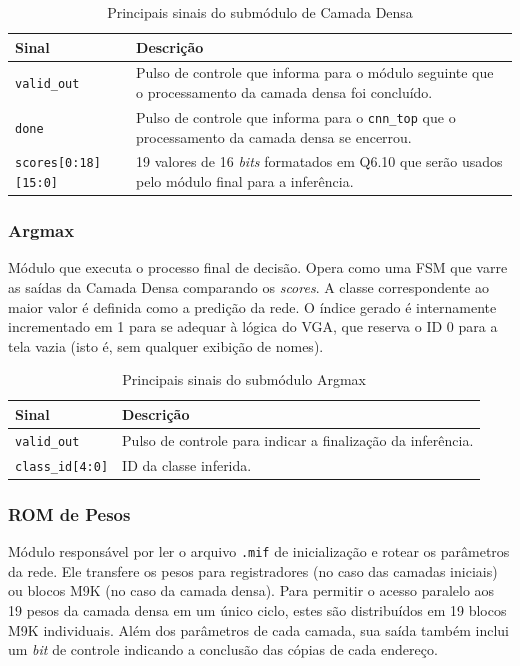 \begin{table}[H]
\centering
\caption{Principais sinais do submódulo de Camada Densa}
\label{tab:sinais_camada_densa}
\small
\begin{tabularx}{\textwidth}{l X}
\toprule
\textbf{Sinal} & \textbf{Descrição} \\
\midrule
\texttt{valid\_out} & Pulso de controle que informa para o módulo seguinte que o processamento da camada densa foi concluído. \\
\texttt{done} & Pulso de controle que informa para o \texttt{cnn\_top} que o processamento da camada densa se encerrou. \\
\texttt{scores[0:18][15:0]} & 19 valores de 16 \textit{bits} formatados em Q6.10 que serão usados pelo módulo final para a inferência. \\
\bottomrule
\end{tabularx}
\end{table}

\subsubsection{Argmax}
Módulo que executa o processo final de decisão. Opera como uma FSM que varre as saídas da Camada Densa comparando os \textit{scores}. A classe correspondente ao maior valor é definida como a predição da rede. O índice gerado é internamente incrementado em 1 para se adequar à lógica do VGA, que reserva o ID 0 para a tela vazia (isto é, sem qualquer exibição de nomes).

\begin{table}[H]
\centering
\caption{Principais sinais do submódulo Argmax}
\label{tab:sinais_argmax}
\small
\begin{tabularx}{\textwidth}{l X}
\toprule
\textbf{Sinal} & \textbf{Descrição} \\
\midrule
\texttt{valid\_out} & Pulso de controle para indicar a finalização da inferência. \\
\texttt{class\_id[4:0]} & ID da classe inferida. \\
\bottomrule
\end{tabularx}
\end{table}

\subsubsection{ROM de Pesos}
Módulo responsável por ler o arquivo \texttt{.mif} de inicialização e rotear os parâmetros da rede. Ele transfere os pesos para registradores (no caso das camadas iniciais) ou blocos M9K (no caso da camada densa). Para permitir o acesso paralelo aos 19 pesos da camada densa em um único ciclo, estes são distribuídos em 19 blocos M9K individuais. Além dos parâmetros de cada camada, sua saída também inclui um \textit{bit} de controle indicando a conclusão das cópias de cada endereço.

